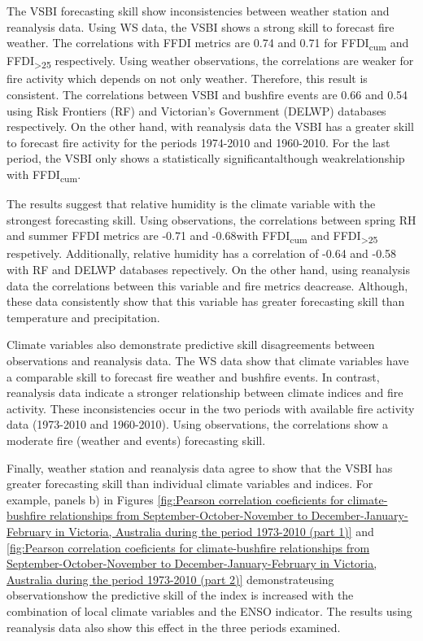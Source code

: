 The VSBI forecasting skill show inconsistencies between weather station
and reanalysis data. Using WS data, the VSBI shows a strong skill
to forecast fire weather. The correlations with FFDI metrics are 0.74
and 0.71 for FFDI\textsubscript{cum} and FFDI\textsubscript{>25}
respectively. Using weather observations, the correlations are weaker for
fire activity which depends on not only weather. Therefore, this result
is consistent. The correlations between VSBI and bushfire events are
0.66 and 0.54 using Risk Frontiers (RF) and Victorian's Government
(DELWP) databases respectively. On the other hand, with reanalysis
data the VSBI has a greater skill to forecast fire activity for the periods 1974-2010 and 1960-2010. 
For the last period, the VSBI only shows a statistically significant\textemdash although
weak\textemdash relationship with FFDI\textsubscript{cum}. 

The results suggest that relative humidity is the climate variable
with the strongest forecasting skill. Using observations, the correlations
between spring RH and summer FFDI metrics are -0.71 and -0.68\textemdash with
FFDI\textsubscript{cum} and FFDI\textsubscript{>25} respetively\textemdash .
Additionally, relative humidity has a correlation of -0.64 and -0.58
with RF and DELWP databases repectively. On the other hand, using
reanalysis data the correlations between this variable and fire metrics
deacrease. Although, these data consistently show that this variable
has greater forecasting skill than temperature and precipitation. 

Climate variables also demonstrate predictive skill disagreements
between observations and reanalysis data. The WS data show that climate
variables have a comparable skill to forecast fire weather and bushfire
events. In contrast, reanalysis data indicate a stronger relationship
between climate indices and fire activity. These inconsistencies occur
in the two periods with available fire activity data (1973-2010 and
1960-2010). Using observations, the correlations show a moderate
fire (weather and events) forecasting skill. 

Finally, weather station and reanalysis data agree to show that the
VSBI has greater forecasting skill than individual climate variables
and indices. For example, panels b) in Figures \ref{fig:Pearson correlation coeficients for climate-bushfire relationships from September-October-November to December-January-February in Victoria, Australia during the period 1973-2010 (part 1)}
and \ref{fig:Pearson correlation coeficients for climate-bushfire relationships from September-October-November to December-January-February in Victoria, Australia during the period 1973-2010 (part 2)}
demonstrate\textemdash using observations\textemdash how the predictive
skill of the index is increased with the combination of local climate
variables and the ENSO indicator. The results using reanalysis data
also show this effect in the three periods examined.

